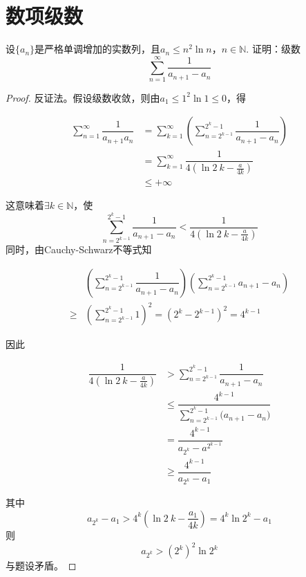 \section{数项级数}

\begin{proposition}

    设$\{a_n\}$是严格单调增加的实数列，且$a_n \leq n^2 \ln n$，$n\in\mathbb{N}$. 证明：级数
    \[ \sum\limits_{n = 1}^{\infty}{\dfrac{1}{a_{n + 1} - a_n}}\]

\end{proposition}

\begin{proof}

    反证法。假设级数收敛，则由$a_1 \leq 1^2 \ln1 \leq 0$，得
    
    \begin{align*}
        \sum\limits_{n = 1}^{\infty}{\dfrac{1}{a_{n + 1}a_n}} & = \sum\limits_{k = 1}^{\infty}{\left( \sum\limits_{n = 2^{k - 1}}^{2^k - 1}{\dfrac{1}{a_{n + 1} - a_n}} \right)} \\
        & = \sum\limits_{k = 1}^{\infty}{\dfrac{1}{4(\ln{2}\ k - \frac{a}{4k})}} \\
        & \leq +\infty
    \end{align*}

    这意味着$\exists k \in \mathbb{N}$，使
    \[ \sum\limits_{n = 2^{k - 1}}^{2^k - 1}{\dfrac{1}{a_{n + 1} - a_n}} < \dfrac{1}{4(\ln{2}\ k - \frac{a}{4k})}\]
    同时，由\textup{Cauchy-Schwarz}不等式知

    \begin{align*}
        & \left( \sum\limits_{n = 2^{k - 1}}^{2^k - 1}{\dfrac{1}{a_{n + 1} - a_n}} \right) \left( \sum\limits_{n = 2^{k - 1}}^{2^k - 1}{a_{n + 1} - a_n} \right) \\
        \geq & \left( \sum\limits_{n = 2^{k - 1}}^{2^k - 1}{1} \right)^2 = (2^k - 2^{k - 1})^2 =  4^{k - 1}
    \end{align*}

    因此

    \begin{align*}
        \dfrac{1}{4(\ln{2}\ k - \frac{a}{4k})} & > \sum\limits_{n = 2^{k - 1}}^{2^k - 1}{\dfrac{1}{a_{n + 1} - a_n}} \\
        & \leq \dfrac{4^{k - 1}}{\sum\limits_{n = 2^{k - 1}}^{2^k - 1}{(a_{n + 1} - a_n})} \\
        & = \dfrac{4^{k - 1}}{a_{2^k} - a^{2^{k - 1}}} \\
        & \geq \dfrac{4^{k - 1}}{a_{2^k} - a_1}
    \end{align*}

    其中
    \[a_{2^k} - a_1 > 4^k\left( \ln{2}\ k - \dfrac{a_1}{4k} \right) = 4^k \ln{2^k} - a_1\]
    则
    \[a_{2^k} > (2^k)^2 \ln{2^k}\]
    与题设矛盾。

\end{proof}


